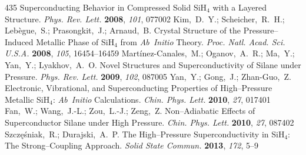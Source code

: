 \documentclass[12pt,letterpaper,oneside]{article}
\begin{document}
\begin{mcitethebibliography}{435}
    Superconducting Behavior in Compressed Solid SiH$_4$ with a
  Layered Structure. \emph{Phys. Rev. Lett.} \textbf{2008}, \emph{101},
  077002\relax
\mciteBstWouldAddEndPuncttrue
\mciteSetBstMidEndSepPunct{\mcitedefaultmidpunct}
{\mcitedefaultendpunct}{\mcitedefaultseppunct}\relax
\EndOfBibitem
{}
Kim,~D.~Y.; Scheicher,~R.~H.; Leb{\`e}gue,~S.; Prasongkit,~J.; Arnaud,~B.
    Crystal Structure of the Pressure--Induced Metallic Phase of
  SiH$_4$ from \emph{Ab~Initio} Theory. \emph{Proc. Natl. Acad. Sci. U.S.A.}
  \textbf{2008}, \emph{105}, 16454--16459\relax
\mciteBstWouldAddEndPuncttrue
\mciteSetBstMidEndSepPunct{\mcitedefaultmidpunct}
{\mcitedefaultendpunct}{\mcitedefaultseppunct}\relax
\EndOfBibitem
{}
Mart{\'i}nez-Canales,~M.; Oganov,~A.~R.; Ma,~Y.; Yan,~Y.; Lyakhov,~A.~O.
    Novel Structures and Superconductivity of Silane under
  Pressure. \emph{Phys. Rev. Lett.} \textbf{2009}, \emph{102}, 087005\relax
\mciteBstWouldAddEndPuncttrue
\mciteSetBstMidEndSepPunct{\mcitedefaultmidpunct}
{\mcitedefaultendpunct}{\mcitedefaultseppunct}\relax
\EndOfBibitem
{}
Yan,~Y.; Gong,~J.; Zhan-Guo,~Z. Electronic, Vibrational, and Superconducting
  Properties of High--Pressure Metallic SiH$_4$: \emph{Ab~Initio} Calculations.
  \emph{Chin. Phys. Lett.} \textbf{2010}, \emph{27}, 017401\relax
\mciteBstWouldAddEndPuncttrue
\mciteSetBstMidEndSepPunct{\mcitedefaultmidpunct}
{\mcitedefaultendpunct}{\mcitedefaultseppunct}\relax
\EndOfBibitem
{}
Fan,~W.; Wang,~J.-L.; Zou,~L.-J.; Zeng,~Z. Non--Adiabatic Effects of
  Superconductor Silane under High Pressure. \emph{Chin. Phys. Lett.}
  \textbf{2010}, \emph{27}, 087402\relax
\mciteBstWouldAddEndPuncttrue
\mciteSetBstMidEndSepPunct{\mcitedefaultmidpunct}
{\mcitedefaultendpunct}{\mcitedefaultseppunct}\relax
\EndOfBibitem
{}
Szcz{\k e}{\'s}niak,~R.; Durajski,~A.~P. The High--Pressure Superconductivity
  in SiH$_4$: The Strong--Coupling Approach. \emph{Solid State Commun.}
  \textbf{2013}, \emph{172}, 5--9\relax
\mciteBstWouldAddEndPuncttrue
\mciteSetBstMidEndSepPunct{\mcitedefaultmidpunct}
{\mcitedefaultendpunct}{\mcitedefaultseppunct}\relax

\end{mcitethebibliography}
\end{document}
